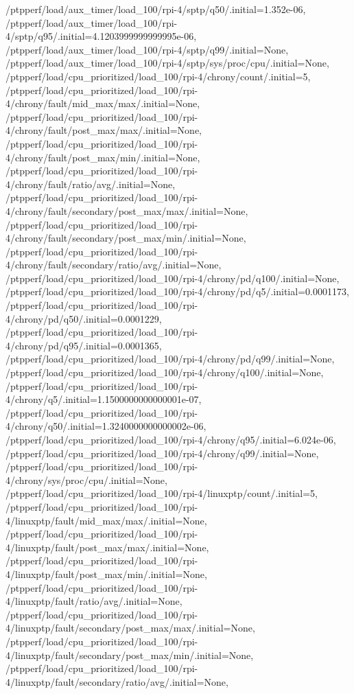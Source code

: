 {    /ptpperf/load/aux_timer/load_100/rpi-4/sptp/q50/.initial=1.352e-06,
    /ptpperf/load/aux_timer/load_100/rpi-4/sptp/q95/.initial=4.1203999999999995e-06,
    /ptpperf/load/aux_timer/load_100/rpi-4/sptp/q99/.initial=None,
    /ptpperf/load/aux_timer/load_100/rpi-4/sptp/sys/proc/cpu/.initial=None,
    /ptpperf/load/cpu_prioritized/load_100/rpi-4/chrony/count/.initial=5,
    /ptpperf/load/cpu_prioritized/load_100/rpi-4/chrony/fault/mid_max/max/.initial=None,
    /ptpperf/load/cpu_prioritized/load_100/rpi-4/chrony/fault/post_max/max/.initial=None,
    /ptpperf/load/cpu_prioritized/load_100/rpi-4/chrony/fault/post_max/min/.initial=None,
    /ptpperf/load/cpu_prioritized/load_100/rpi-4/chrony/fault/ratio/avg/.initial=None,
    /ptpperf/load/cpu_prioritized/load_100/rpi-4/chrony/fault/secondary/post_max/max/.initial=None,
    /ptpperf/load/cpu_prioritized/load_100/rpi-4/chrony/fault/secondary/post_max/min/.initial=None,
    /ptpperf/load/cpu_prioritized/load_100/rpi-4/chrony/fault/secondary/ratio/avg/.initial=None,
    /ptpperf/load/cpu_prioritized/load_100/rpi-4/chrony/pd/q100/.initial=None,
    /ptpperf/load/cpu_prioritized/load_100/rpi-4/chrony/pd/q5/.initial=0.0001173,
    /ptpperf/load/cpu_prioritized/load_100/rpi-4/chrony/pd/q50/.initial=0.0001229,
    /ptpperf/load/cpu_prioritized/load_100/rpi-4/chrony/pd/q95/.initial=0.0001365,
    /ptpperf/load/cpu_prioritized/load_100/rpi-4/chrony/pd/q99/.initial=None,
    /ptpperf/load/cpu_prioritized/load_100/rpi-4/chrony/q100/.initial=None,
    /ptpperf/load/cpu_prioritized/load_100/rpi-4/chrony/q5/.initial=1.1500000000000001e-07,
    /ptpperf/load/cpu_prioritized/load_100/rpi-4/chrony/q50/.initial=1.3240000000000002e-06,
    /ptpperf/load/cpu_prioritized/load_100/rpi-4/chrony/q95/.initial=6.024e-06,
    /ptpperf/load/cpu_prioritized/load_100/rpi-4/chrony/q99/.initial=None,
    /ptpperf/load/cpu_prioritized/load_100/rpi-4/chrony/sys/proc/cpu/.initial=None,
    /ptpperf/load/cpu_prioritized/load_100/rpi-4/linuxptp/count/.initial=5,
    /ptpperf/load/cpu_prioritized/load_100/rpi-4/linuxptp/fault/mid_max/max/.initial=None,
    /ptpperf/load/cpu_prioritized/load_100/rpi-4/linuxptp/fault/post_max/max/.initial=None,
    /ptpperf/load/cpu_prioritized/load_100/rpi-4/linuxptp/fault/post_max/min/.initial=None,
    /ptpperf/load/cpu_prioritized/load_100/rpi-4/linuxptp/fault/ratio/avg/.initial=None,
    /ptpperf/load/cpu_prioritized/load_100/rpi-4/linuxptp/fault/secondary/post_max/max/.initial=None,
    /ptpperf/load/cpu_prioritized/load_100/rpi-4/linuxptp/fault/secondary/post_max/min/.initial=None,
    /ptpperf/load/cpu_prioritized/load_100/rpi-4/linuxptp/fault/secondary/ratio/avg/.initial=None,
}
